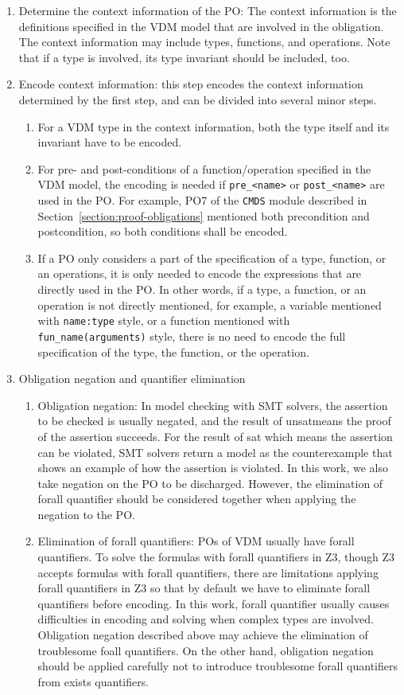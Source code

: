 \begin{enumerate}
\item
Determine the context information of the PO: The context information is the definitions specified in the VDM model that are involved in the obligation. The context information may include types, functions, and operations. Note that if a type is involved, its type invariant should be included, too.
\item
Encode context information: this step encodes the context information determined by the first step, and can be divided into several minor steps.
\begin{enumerate}
\item
For a VDM type in the context information, both the type itself and its invariant have to be encoded.
\item
For pre- and post-conditions of a function/operation specified in the VDM model, the encoding is needed if {\tt pre\_<name>} or {\tt post\_<name>} are used in the PO. For example, PO7 of the {\tt CMDS} module described in Section~\ref{section:proof-obligations} mentioned both precondition and postcondition, so both conditions shall be encoded.
\item
If a PO only considers a part of the specification of a type, function, or an operations, it is only needed to encode the expressions that are directly used in the PO. In other words, if a type, a function, or an operation is not directly mentioned, for example, a variable mentioned with {\tt name:type} style, or a function mentioned with {\tt fun\_name(arguments)} style, there is no need to encode the full specification of the type, the function, or the operation.
\end{enumerate}
\item
Obligation negation and quantifier elimination
\begin{enumerate}
\item
Obligation negation: In model checking with SMT solvers, the assertion to be checked is usually negated, and the result of unsatmeans the proof of the assertion succeeds. For the result of sat which means the assertion can be violated, SMT solvers return a model as the counterexample that shows an example of how the assertion is violated. In this work, we also take negation on the PO to be discharged. However, the elimination of forall quantifier should be considered together when applying the negation to the PO.
\item
Elimination of forall quantifiers: POs of VDM usually have forall quantifiers. To solve the formulas with forall quantifiers in Z3, though Z3 accepts formulas with forall quantifiers, there are limitations applying forall quantifiers in Z3 so that by default we have to eliminate forall quantifiers before encoding. In this work, forall quantifier usually causes difficulties in encoding and solving when complex types are involved. Obligation negation described above may achieve the elimination of troublesome foall quantifiers. On the other hand, obligation negation should be applied carefully not to introduce troublesome forall quantifiers from exists quantifiers.

\end{enumerate}
\end{enumerate}
